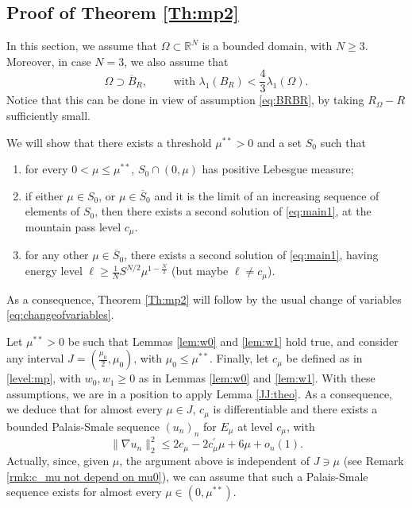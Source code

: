 \documentclass[10pt]{article}
\newcommand{\R}{\mathbb{R}}
\theoremstyle{definition}
\numberwithin{equation}{section}
\begin{document}
\subsection{Proof of Theorem \ref{Th:mp2}}\label{sec:th2}
In this section, we assume that $\Omega\subset\R^N$ is a bounded domain, with $N\ge3$. Moreover,
in case $N=3$, we also assume that
\begin{equation}\label{eq:assumpt_ball_N=3}
\Omega\supset \overline{B}_R,\qquad\text{ with }\lambda_1(B_R) < \frac43 \lambda_1(\Omega).
\end{equation}
Notice that this can be done in view of assumption \eqref{eq:BRBR}, by taking $R_\Omega - R$ sufficiently small. 

We will show that there exists a threshold $\mu^{**}>0$ and a set $S_0$ such that
\begin{enumerate}
\item for every $0<\mu\le\mu^{**}$, $S_0\cap \left(0,\mu\right)$ has positive Lebesgue measure;
\item if either $\mu \in S_0$, or $\mu\in \overline{S}_0$ and it is the limit of an increasing sequence of
elements of $S_0$, then there exists a second solution of \eqref{eq:main1}, at the mountain pass
level $c_\mu$.
\item for any other $\mu\in \overline{S}_0$, there exists a second solution of \eqref{eq:main1},
having energy level $\ell\ge \frac{1}{N}S^{N/2}\mu^{1-\frac{N}{2}}$ (but maybe $\ell\neq c_\mu$).
\end{enumerate}
As a consequence, Theorem \ref{Th:mp2} will follow by the usual change of variables
\eqref{eq:changeofvariables}.



Let $\mu^{**}>0$ be such that Lemmas \ref{lem:w0} and \ref{lem:w1} hold true, and consider any interval $J= \left(\frac{\mu_0}{2},\mu_0\right)$, with $\mu_0\le\mu^{**}$. Finally, let $c_\mu$ be defined
as in \eqref{level:mp}, with $w_{0},w_{1}\geq0$ as in Lemmas \ref{lem:w0} and \ref{lem:w1}. With
these assumptions, we are in a position to apply Lemma \ref{JJ:theo}. As a consequence, we deduce that
for almost every $\mu\in J$, $c_\mu$ is differentiable and there exists a bounded Palais-Smale sequence
$(u_{n})_{n}$ for $E_{\mu}$ at level $c_{\mu}$, with
\begin{equation}\label{bound:u:mp}
\|\nabla u_{n}\|_{2}^{2} \le 2c_{\mu}-2c^{\prime}_{\mu}\mu
+6\mu +o_n(1).
\end{equation}
Actually, since, given $\mu$, the argument above is independent of $J\ni\mu$ (see Remark \ref{rmk:c_mu not depend on mu0}), we can assume that such a Palais-Smale sequence exists for almost every
$\mu\in (0,\mu^{**})$.
\end{document}
